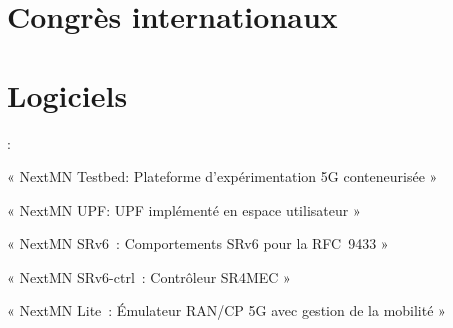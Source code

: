 \documentclass[../main.tex]{subfiles}
\begin{document}
\begin{contrib}
\section*{Congrès internationaux}
\begin{enumerate}[label={[C\arabic*]}]
    \item {}
    \item {}
    \item {}
\end{enumerate}

\section*{Logiciels}
{\parindent0pt :}
    \begin{enumerate}[label={[L\arabic*]}]
        \item « NextMN Testbed: Plateforme d’expérimentation 5G conteneurisée »
        \item « NextMN UPF: UPF implémenté en espace utilisateur »
        \item « NextMN SRv6 : Comportements SRv6 pour la RFC~9433 »
        \item « NextMN SRv6-ctrl : Contrôleur SR4MEC »
        \item « NextMN Lite : Émulateur RAN/CP 5G avec gestion de la mobilité »
    \end{enumerate}
\end{contrib}
\end{document}
